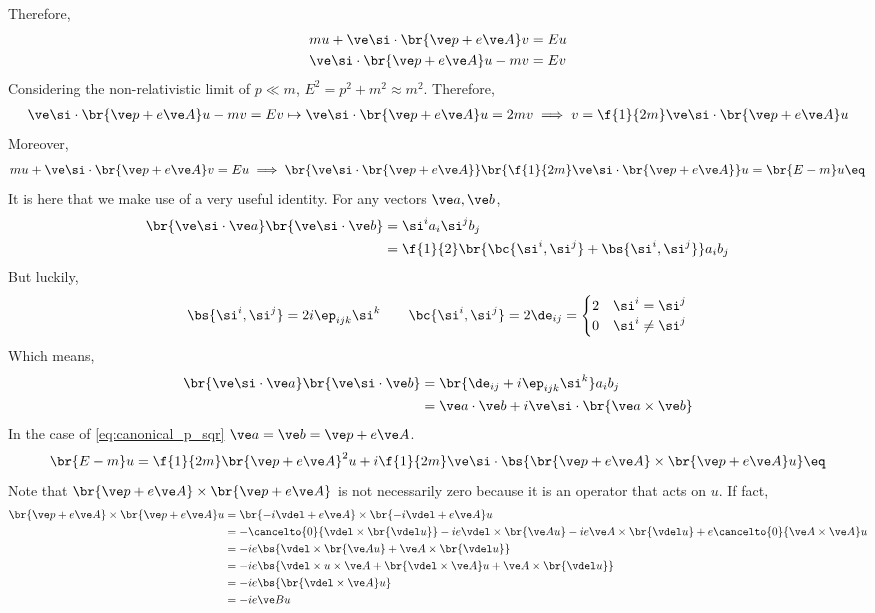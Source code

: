 \documentclass{article}
\begin{document}
Therefore,
\begin{align*}
m u + \ve \si \cdot \br{\ve p + e \ve A} v &= E u \\
\ve \si \cdot \br{\ve p + e \ve A} u - m v &= E v
\end{align*}
Considering the non-relativistic limit of $p \ll m$, $E^2 = p^2 + m^2 \approx m^2$. Therefore,
\begin{align*}
\ve \si \cdot \br{\ve p + e \ve A} u - m v = E v \mapsto \ve \si \cdot \br{\ve p + e \ve A} u = 2 m v \implies v = \f{1}{2m} \ve \si \cdot \br{\ve p + e \ve A}u
\end{align*}
Moreover,
\[ m u + \ve \si \cdot \br{\ve p + e \ve A} v = E u \implies \br{\ve \si \cdot \br{\ve p + e \ve A}} \br{\f{1}{2m} \ve \si \cdot \br{\ve p + e \ve A}}u = \br{E - m}u \eq \label{eq:canonical_p_sqr}\]
It is here that we make use of a very useful identity. For any vectors $\ve a, \ve b$,
\begin{align*}
    \br{\ve \si \cdot \ve a} \br{\ve \si \cdot \ve b}
    &= \si^{i} a_{i}\si^{j} b_{j}  \\
    &= \f{1}{2} \br{ \bc{\si^{i},\si^{j}} + \bs{\si^{i}, \si^{j}}}a_{i}b_{j}
\end{align*}
But luckily,
\[ \bs{\si^{i}, \si^{j}} = 2 i \ep_{ijk}\si^{k} \qquad \bc{\si^{i}, \si^{j}} = 2 \de_{ij} = \begin{cases}
    2 & \si^{i} = \si^{j} \\
    0 & \si^{i} \neq \si^{j}
\end{cases} \]
Which means,
\begin{align*}
    \br{\ve \si \cdot \ve a} \br{\ve \si \cdot \ve b}
    &= \br{ \de_{ij} + i \ep_{ijk}\si^{k}}a_{i}b_{j} \\
    &= \ve a \cdot \ve b + i \ve \si \cdot \br{\ve a \times \ve b}
\end{align*}
In the case of \cref{eq:canonical_p_sqr} $\ve a = \ve b = \ve p + e \ve A$.
\[ \br{E - m}u = \f{1}{2m} \br{\ve p + e \ve A}^2 u + i \f{1}{2m} \ve \si \cdot \bs{\br{\ve p + e \ve A}\times \br{\ve p + e \ve A} u} \eq \label{eq:sqr_mess}\]
Note that $\br{\ve p + e \ve A}\times \br{\ve p + e \ve A}$ is not necessarily zero because it is an operator that acts on $u$. If fact,
\begin{align*}
    \br{\ve p + e \ve A}\times \br{\ve p + e \ve A} u
    &= \br{-i\vdel + e \ve A}\times \br{-i\vdel + e \ve A} u\\
    &= - \cancelto{0}{\vdel \times \br{\vdel u}} - i e \vdel \times \br{\ve A u} - i e \ve A \times \br{\vdel u} + e \cancelto{0}{\ve A \times \ve A} u \\
    &= - i e \bs{\vdel \times \br{\ve A u} + \ve A \times \br{\vdel u}} \\
    &= - i e \bs{\vdel \times u \times \ve A + \br{\vdel \times \ve A} u + \ve A \times \br{\vdel u}} \\
    &= - i e \bs{\br{\vdel \times \ve A} u} \\
    &= - i e \ve B u
\end{align*}
\end{document}
